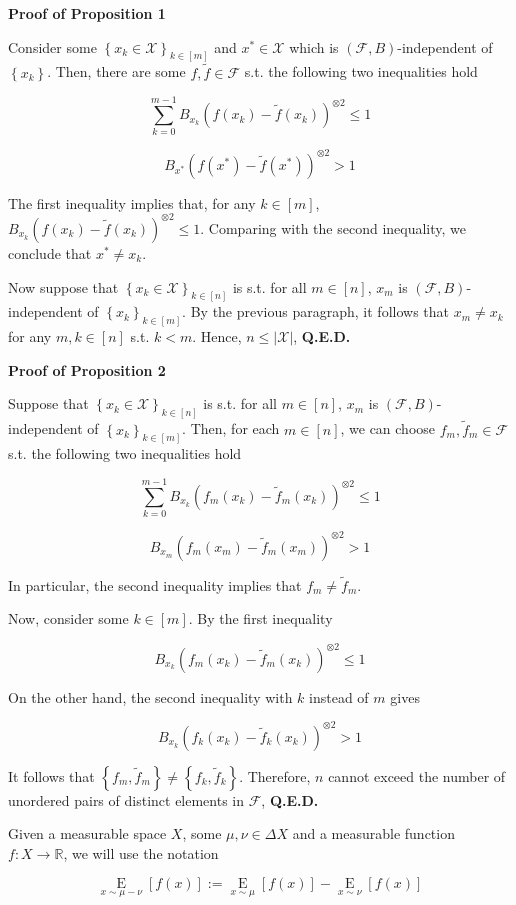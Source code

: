 \documentclass[a4paper]{article}
\newcommand{\Co}[1]{}
\newcommand{\AP}[1]{\left(#1\right)}
\newcommand{\AB}[1]{\left[#1\right]}
\newcommand{\AC}[1]{\left\{#1\right\}}
\newcommand{\Ea}[2]{\underset{#1}{\operatorname{E}}\AB{#2}}
\newcommand{\Reals}{\mathbb{R}}
\newcommand{\Abs}[1]{\left\vert #1 \right\vert}
\newcommand{\B}{B}
\newcommand{\X}{\mathcal{X}}
\newcommand{\F}{\mathcal{F}}
\begin{document}
\textbf{Proof of Proposition 1}\Co{b}

Consider some $\AC{x_k\in\X}_{k\in[m]}$ and $x^*\in\X$ which is $(\F,\B)$-independent of $\AC{x_k}$. Then, there are some $f,\tilde{f}\in\F$ s.t. the following two inequalities hold

$$\sum_{k=0}^{m-1}\B _{x_k}\AP{f\AP{x_k}-\tilde{f}\AP{x_k}}^{\otimes 2}\leq1$$

$$\B _{x^*}\AP{f\AP{x^*}-\tilde{f}\AP{x^*}}^{\otimes 2}>1$$ 

The first inequality implies that, for any $k\in[m]$, $\B _{x_k}\AP{f\AP{x_k}-\tilde{f}\AP{x_k}}^{\otimes 2}\leq1$. Comparing with the second inequality, we conclude that $x^*\ne x_k$.

Now suppose that $\AC{x_k\in\X}_{k\in[n]}$ is s.t. for all $m\in[n]$, $x_m$ is $(\F,\B)$-independent of $\AC{x_k}_{k\in[m]}$. By the previous paragraph, it follows that $x_m\ne x_k$ for any $m,k\in[n]$ s.t. $k<m$. Hence, $n\leq\Abs{\X}$, \textbf{Q.E.D.}\Co{b}

\textbf{Proof of Proposition 2}\Co{b}

Suppose that $\AC{x_k\in\X}_{k\in[n]}$ is s.t. for all $m\in[n]$, $x_m$ is $(\F,\B)$-independent of $\AC{x_k}_{k\in[m]}$. Then, for each $m\in[n]$, we can choose $f_m,\tilde{f}_m\in\F$ s.t. the following two inequalities hold

$$\sum_{k=0}^{m-1}\B _{x_k}\AP{f_m\AP{x_k}-\tilde{f}_m\AP{x_k}}^{\otimes 2}\leq1$$

$$\B _{x_m}\AP{f_m\AP{x_m}-\tilde{f}_m\AP{x_m}}^{\otimes 2}>1$$ 

In particular, the second inequality implies that $f_m\ne\tilde{f}_m$. 

Now, consider some $k\in[m]$. By the first inequality

$$\B _{x_k}\AP{f_m\AP{x_k}-\tilde{f}_m\AP{x_k}}^{\otimes 2}\leq1$$

On the other hand, the second inequality with $k$ instead of $m$ gives

$$\B _{x_k}\AP{f_k\AP{x_k}-\tilde{f}_k\AP{x_k}}^{\otimes 2}>1$$

It follows that $\AC{f_m,\tilde{f}_m}\ne\AC{f_k,\tilde{f}_k}$. Therefore, $n$ cannot exceed the number of unordered pairs of distinct elements in $\F$, \textbf{Q.E.D.}\Co{b}

Given a measurable space $X$, some $\mu,\nu\in\Delta X$ and a measurable function $f:X\rightarrow\Reals$, we will use the notation

$$\Ea{x\sim\mu-\nu}{f(x)}:=\Ea{x\sim\mu}{f(x)}-\Ea{x\sim\nu}{f(x)}$$
\end{document}
